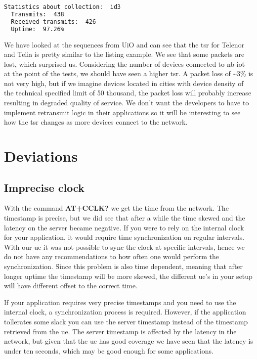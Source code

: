 \documentclass[USenglish]{ifimaster}  %
\begin{document}
\begin{lstlisting}[caption={uptime.py example}, label={code:uptimerun}, language=Bash]
  Statistics about collection:  id3
  Transmits:  438
  Received transmits:  426
  Uptime:  97.26%
\end{lstlisting}

We have looked at the sequences from UiO and can see that the \acrshort{tsr} for Telenor and Telia is pretty similar to the listing example. We see that some packets are lost, which surprised us. Considering the number of devices connected to \acrshort{nb-iot} at the point of the tests, we should have seen a higher \acrshort{tsr}. A packet loss of \textasciitilde3\% is not very high, but if we imagine devices located in cities with device density of the technical specified limit of 50 thousand, the packet loss will probably increase resulting in degraded quality of service. We don't want the developers to have to implement retransmit logic in their applications so it will be interesting to see how the \acrshort{tsr} changes as more devices connect to the network.

\chapter{Deviations} \label{section:deviations}
\section{Imprecise clock}
With the command \textbf{AT+CCLK?} we get the time from the network. The timestamp is precise, but we did see that after a while the time skewed and the latency on the server became negative. If you were to rely on the internal clock for your application, it would require time synchronization on regular intervals. With our \acrshort{ue} it was not possible to sync the clock at specific intervals, hence we do not have any recommendations to how often one would perform the synchronization. Since this problem is also time dependent, meaning that after longer uptime the timestamp will be more skewed, the different \acrshort{ue}'s in your setup will have different offset to the correct time.

If your application requires very precise timestamps and you need to use the internal clock, a synchronization process is required. However, if the application tollerates some slack you can use the server timestamp instead of the timestamp retrieved from the \acrshort{ue}. The server timestamp is affected by the latency in the network, but given that the \acrshort{ue} has good coverage we have seen that the latency is under ten seconds, which may be good enough for some applications.
\end{document}
